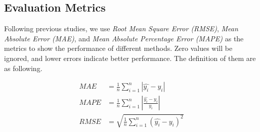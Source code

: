 \subsection{Evaluation Metrics}
Following previous studies, we use \textit{Root Mean Square Error (RMSE)}, \textit{Mean Absolute Error (MAE)}, and \textit{Mean Absolute Percentage Error (MAPE)} as the metrics to show the performance of different methods. Zero values will be ignored, and lower errors indicate better performance. The definition of them are as following.

\begin{equation}
    \begin{aligned}
        MAE  & =\frac 1n\sum_{i=1}^n|\hat{y_i}-y_i|             \\
        MAPE & =\frac 1n\sum_{i=1}^n|\frac{\hat{y_i}-y_i}{y_i}| \\
        RMSE & =\sqrt{\frac 1n\sum_{i=1}^n(\hat{y_i}-y_i)^2}
    \end{aligned}
\end{equation}

